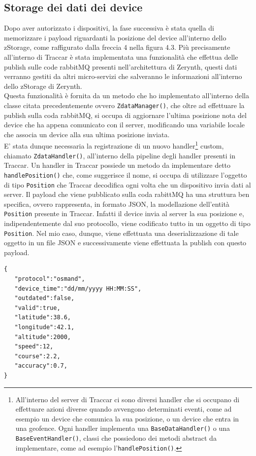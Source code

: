 \documentclass[a4paper,titlepage,12pt]{report}
\begin{document}
{\subsection{
Storage dei dati dei device}
Dopo aver autorizzato i dispositivi, la fase successiva è stata quella di memorizzare i payload riguardanti la posizione del device all'interno dello zStorage, come raffigurato dalla freccia 4 nella figura 4.3. Più precisamente all'interno di Traccar è stata implementata una funzionalità che effettua delle publish sulle code rabbitMQ presenti nell'architettura di Zerynth, questi dati verranno gestiti da altri micro-servizi che salveranno le informazioni all'interno dello zStorage di Zerynth.\\
Questa funzionalità è fornita da un metodo che ho implementato all'interno della classe citata precedentemente ovvero \texttt{ZdataManager()}, che oltre ad effettuare la publish sulla coda rabbitMQ, si occupa di aggiornare l'ultima posizione nota del device che ha appena comunicato con il server, modificando una variabile locale che associa un device alla sua ultima posizione inviata.\\
E' stata dunque necessaria la registrazione di un nuovo handler\footnote{
All'interno del server di Traccar ci sono diversi handler che si occupano di effettuare azioni diverse quando avvengono determinati eventi, come ad esempio un device che comunica la sua posizione, o un device che entra in una geofence. Ogni handler implementa una \texttt{BaseDataHandler()} o una \texttt{BaseEventHandler()}, classi che possiedono dei metodi abstract da implementare, come ad esempio l'\texttt{handlePosition()}.} custom, chiamato \texttt{ZdataHandler()}, all'interno della pipeline degli handler presenti in Traccar. Un handler in Traccar possiede un metodo da implementare detto \texttt{handlePosition()} che, come suggerisce il nome, si occupa di utilizzare l'oggetto di tipo \texttt{Position} che Traccar decodifica ogni volta che un dispositivo invia dati al server.
Il payload che viene pubblicato sulla coda rabittMQ ha una struttura ben specifica, ovvero rappresenta, in formato JSON, la modellazione dell'entità \texttt{Position} presente in Traccar. Infatti il device invia al server la sua posizione e, indipendentemente dal suo protocollo, viene codificato tutto in un oggetto di tipo \texttt{Position}. Nel mio caso, dunque, viene effettuata una deserializzazione di tale oggetto in un file JSON e successivamente viene effettuata la publish con questo payload.

\begin{verbatim}
{
   "protocol":"osmand",
   "device_time":"dd/mm/yyyy HH:MM:SS",
   "outdated":false,
   "valid":true,
   "latitude":38.6, 
   "longitude":42.1,
   "altitude":2000,
   "speed":12,
   "course":2.2,
   "accuracy":0.7,
}
\end{verbatim}

}
\end{document}

